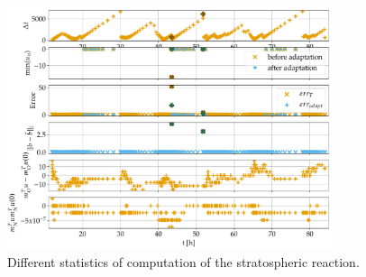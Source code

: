 \begin{figure}
\centering
\includegraphics[width=0.85\textwidth]{plots/Stratospheric_stepsize,b.pdf}
\caption{Different statistics of computation of the stratospheric reaction.}
\label{fig:Stats_Strat}
\end{figure}


    